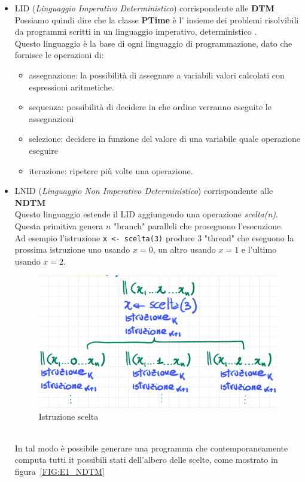 \documentclass[a4paper]{article}
\begin{document}
\begin{itemize}
	\item LID (\textit{Linguaggio Imperativo Deterministico}) corrispondente alle \textbf{DTM}\\
		Possiamo quindi dire che la classe \textbf{PTime} è l' insieme dei problemi risolvibili da programmi scritti in un linguaggio imperativo, deterministico .\\
		Questo linguaggio è la base di ogni linguaggio di programmazione, dato che fornisce le operazioni di:
		\begin{itemize}
			\item assegnazione: la possibilità di assegnare a variabili valori calcolati con espressioni aritmetiche.
			\item sequenza: possibilità di decidere in che ordine verranno eseguite le assegnazioni
			\item selezione: decidere in funzione del valore di una variabile quale operazione eseguire
			\item iterazione: ripetere più volte una operazione.
		\end{itemize}
	\item LNID (\textit{Linguaggio Non Imperativo Deterministico}) corrispondente alle \textbf{NDTM}\\
		Questo linguaggio estende il LID aggiungendo una operazione \textit{scelta(n)}.
		Questa primitiva genera $n$ "branch" paralleli che proseguono l'esecuzione.\\
		Ad esempio l'istruzione \texttt{x <- scelta(3)} produce 3 "thread" che eseguono la prossima istruzione uno usando $x=0$, un altro usando $x=1$ e l'ultimo usando $x=2$.\\
		\begin{figure}[!ht]
		\centering
		\includegraphics[scale = 0.5]{./img/E2.png}
		\caption{Istruzione scelta} \label{FIG:E2}
		\end{figure}\\
		In tal modo è possibile generare una programma che contemporaneamente computa tutti it possibili stati dell'albero delle scelte, come mostrato in figura~\ref{FIG:E1_NDTM}
		\end{itemize}
\end{document}
